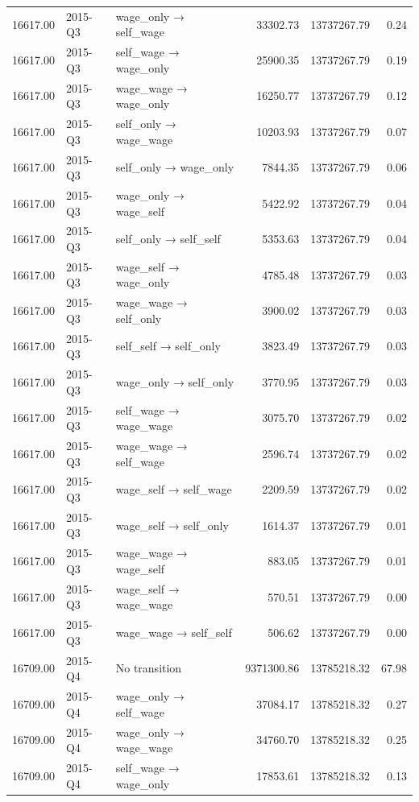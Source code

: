 \begin{table}[ht]
{\begin{tabular}{rllrrr}
  16617.00 & 2015-Q3 & wage\_only → self\_wage & 33302.73 & 13737267.79 & 0.24 \\ 
  16617.00 & 2015-Q3 & self\_wage → wage\_only & 25900.35 & 13737267.79 & 0.19 \\ 
  16617.00 & 2015-Q3 & wage\_wage → wage\_only & 16250.77 & 13737267.79 & 0.12 \\ 
  16617.00 & 2015-Q3 & self\_only → wage\_wage & 10203.93 & 13737267.79 & 0.07 \\ 
  16617.00 & 2015-Q3 & self\_only → wage\_only & 7844.35 & 13737267.79 & 0.06 \\ 
  16617.00 & 2015-Q3 & wage\_only → wage\_self & 5422.92 & 13737267.79 & 0.04 \\ 
  16617.00 & 2015-Q3 & self\_only → self\_self & 5353.63 & 13737267.79 & 0.04 \\ 
  16617.00 & 2015-Q3 & wage\_self → wage\_only & 4785.48 & 13737267.79 & 0.03 \\ 
  16617.00 & 2015-Q3 & wage\_wage → self\_only & 3900.02 & 13737267.79 & 0.03 \\ 
  16617.00 & 2015-Q3 & self\_self → self\_only & 3823.49 & 13737267.79 & 0.03 \\ 
  16617.00 & 2015-Q3 & wage\_only → self\_only & 3770.95 & 13737267.79 & 0.03 \\ 
  16617.00 & 2015-Q3 & self\_wage → wage\_wage & 3075.70 & 13737267.79 & 0.02 \\ 
  16617.00 & 2015-Q3 & wage\_wage → self\_wage & 2596.74 & 13737267.79 & 0.02 \\ 
  16617.00 & 2015-Q3 & wage\_self → self\_wage & 2209.59 & 13737267.79 & 0.02 \\ 
  16617.00 & 2015-Q3 & wage\_self → self\_only & 1614.37 & 13737267.79 & 0.01 \\ 
  16617.00 & 2015-Q3 & wage\_wage → wage\_self & 883.05 & 13737267.79 & 0.01 \\ 
  16617.00 & 2015-Q3 & wage\_self → wage\_wage & 570.51 & 13737267.79 & 0.00 \\ 
  16617.00 & 2015-Q3 & wage\_wage → self\_self & 506.62 & 13737267.79 & 0.00 \\ 
  16709.00 & 2015-Q4 & No transition & 9371300.86 & 13785218.32 & 67.98 \\ 
  16709.00 & 2015-Q4 & wage\_only → self\_wage & 37084.17 & 13785218.32 & 0.27 \\ 
  16709.00 & 2015-Q4 & wage\_only → wage\_wage & 34760.70 & 13785218.32 & 0.25 \\ 
  16709.00 & 2015-Q4 & self\_wage → wage\_only & 17853.61 & 13785218.32 & 0.13 \\ 

\end{tabular}}
\end{table}
